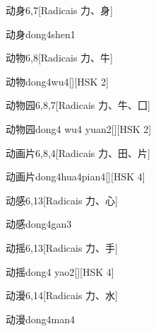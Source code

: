\begin{entry}{动身}{6,7}[Radicais ⼒、⾝]
  \begin{phonetics}{动身}{dong4shen1}
  \end{phonetics}
\end{entry}

\begin{entry}{动物}{6,8}[Radicais ⼒、⽜]
  \begin{phonetics}{动物}{dong4wu4}[][HSK 2]
  \end{phonetics}
\end{entry}

\begin{entry}{动物园}{6,8,7}[Radicais ⼒、⽜、⼞]
  \begin{phonetics}{动物园}{dong4 wu4 yuan2}[][HSK 2]
  \end{phonetics}
\end{entry}

\begin{entry}{动画片}{6,8,4}[Radicais ⼒、⽥、⽚]
  \begin{phonetics}{动画片}{dong4hua4pian4}[][HSK 4]
  \end{phonetics}
\end{entry}

\begin{entry}{动感}{6,13}[Radicais ⼒、⼼]
  \begin{phonetics}{动感}{dong4gan3}
  \end{phonetics}
\end{entry}

\begin{entry}{动摇}{6,13}[Radicais ⼒、⼿]
  \begin{phonetics}{动摇}{dong4 yao2}[][HSK 4]
  \end{phonetics}
\end{entry}

\begin{entry}{动漫}{6,14}[Radicais ⼒、⽔]
  \begin{phonetics}{动漫}{dong4man4}
  \end{phonetics}
\end{entry}

